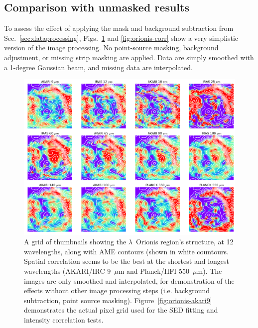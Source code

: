     \subsection{Comparison with unmasked results}
        To assess the effect of applying the mask and background subtraction from Sec.~\ref{sec:dataprocessing}, Figs.~\ref{fig:orionis-img} and \ref{fig:orionis-corr} show a very simplistic version of the image processing. No point-source masking, background adjustment, or missing strip masking are applied. Data are simply smoothed with a 1-degree Gaussian beam, and missing data are interpolated.
          \begin{figure}
            \includegraphics[width=\textwidth]{../Plots/lOrionis_grid_img.png}
            \centering
            \caption{A grid of thumbnails showing the $\lambda$~Orionis region's structure, at 12 wavelengths, along with AME contours (shown in white countours. Spatial correlation seems to be the best at the shortest and longest wavelengths (AKARI/IRC 9~$\mu$m and Planck/HFI 550~$\mu$m). The images are only smoothed and interpolated, for demonstration of the effects without other image processing steps (i.e. background subtraction, point source masking). Figure~\ref{fig:orionis-akari9} demonstrates the actual pixel grid used for the SED fitting and intensity correlation tests.}
            \label{fig:orionis-img}
          \end{figure}
